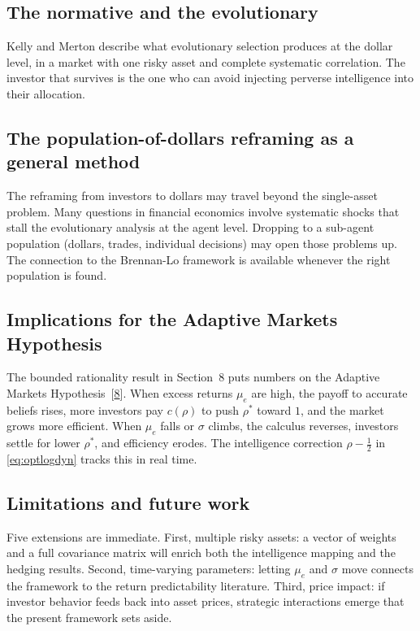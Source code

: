 \documentclass[11pt]{article}
\newcommand{\mue}{\mu_{e}}
\begin{document}
\subsection{The normative and the evolutionary}

Kelly and Merton describe what evolutionary selection produces at the
dollar level, in a market with one risky asset and complete systematic
correlation. The investor that survives is the one who can avoid
injecting perverse intelligence into their allocation.

\subsection{The population-of-dollars reframing as a general method}

The reframing from investors to dollars may travel beyond the
single-asset problem. Many questions in financial economics involve
systematic shocks that stall the evolutionary analysis at the agent
level. Dropping to a sub-agent population (dollars, trades, individual decisions) may open those problems up. The connection to
the Brennan-Lo framework is available whenever the right population
is found.

\subsection{Implications for the Adaptive Markets Hypothesis}

The bounded rationality result in Section~8 puts numbers on the
Adaptive Markets Hypothesis~[\hyperlink{ref:8}{8}]. When excess returns $\mue$ are high,
the payoff to accurate beliefs rises, more investors pay $c(\rho)$
to push $\rho^{*}$ toward $1$, and the market grows more efficient.
When $\mue$ falls or $\sigma$ climbs, the calculus reverses,
investors settle for lower $\rho^{*}$, and efficiency erodes. The
intelligence correction $\rho - \tfrac{1}{2}$ in \eqref{eq:optlogdyn}
tracks this in real time.

\subsection{Limitations and future work}

Five extensions are immediate. First, multiple risky assets: a
vector of weights and a full covariance matrix will enrich both the
intelligence mapping and the hedging results. Second, time-varying
parameters: letting $\mue$ and $\sigma$ move connects the framework
to the return predictability literature. Third, price impact: if
investor behavior feeds back into asset prices, strategic
interactions emerge that the present framework sets aside.
\end{document}
